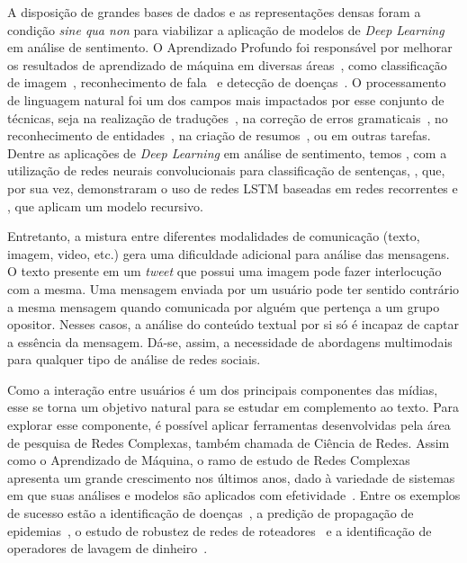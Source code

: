 A disposição de grandes bases de dados e as representações densas foram a
condição \textit{sine qua non} para viabilizar a aplicação de modelos de
\textit{Deep Learning} em análise de sentimento.
O Aprendizado Profundo foi responsável por melhorar os resultados
de aprendizado de máquina em diversas áreas~\cite{lecun15}, como classificação
de imagem~\cite{krizhevsky12}, reconhecimento de fala~\cite{hinton12a} e detecção
de doenças~\cite{esteva17}.
O processamento de linguagem natural foi um dos campos mais impactados por esse
conjunto de técnicas, seja na realização de traduções~\cite{vaswani17},
na correção de erros gramaticais~\cite{ge18}, no reconhecimento de
entidades~\cite{akbik18}, na criação de resumos~\cite{wu18}, ou em outras
tarefas.
Dentre as aplicações de \textit{Deep Learning} em análise de sentimento,
temos \citet{kim14}, com a utilização de redes neurais convolucionais para
classificação de sentenças, \citet{zhou16}, que, por sua vez, demonstraram o
uso de redes LSTM baseadas em redes recorrentes e \citet{socher13}, que aplicam um
modelo recursivo.

Entretanto, a mistura entre diferentes modalidades de comunicação (texto, imagem,
video, etc.) gera uma dificuldade adicional para análise das mensagens.
O texto presente em um \textit{tweet} que possui uma imagem pode fazer
interlocução com a mesma.
Uma mensagem enviada por um usuário pode ter sentido contrário a mesma mensagem
quando comunicada por alguém que pertença a um grupo opositor.
Nesses casos, a análise do conteúdo textual por si só é incapaz de captar a
essência da mensagem.
Dá-se, assim, a necessidade de abordagens multimodais para qualquer tipo de
análise de redes sociais.

Como a interação entre usuários é um dos principais componentes das mídias, esse
se torna um objetivo natural para se estudar em complemento ao texto.
Para explorar esse componente, é possível aplicar ferramentas desenvolvidas pela
área de pesquisa de Redes Complexas, também chamada de Ciência de Redes.
Assim como o Aprendizado de Máquina, o ramo de estudo de Redes Complexas
apresenta um grande crescimento nos últimos anos, dado à variedade de sistemas em
que suas análises e modelos são aplicados com efetividade~\cite{albert02}.
Entre os exemplos de sucesso estão a identificação de doenças~\cite{barabasi11},
a predição de propagação de epidemias~\cite{hufnagel04}, o estudo de robustez de
redes de roteadores~\cite{albert00} e a identificação de operadores de lavagem de
dinheiro~\cite{colladon17}.

